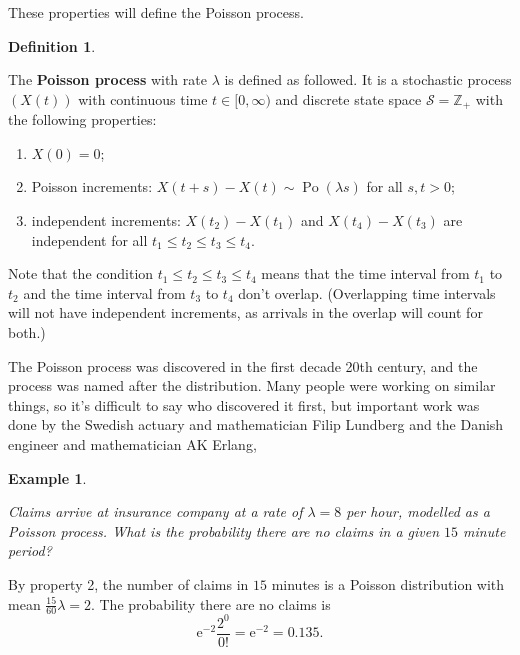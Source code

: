 \documentclass[
  a4paper,
]{article}
\providecommand{\tightlist}{%
  \setlength{\itemsep}{0pt}\setlength{\parskip}{0pt}}
\theoremstyle{definition}
\newtheorem{definition}{Definition}[section]
\theoremstyle{definition}
\newtheorem{example}{Example}[section]
\theoremstyle{definition}
\theoremstyle{remark}
\begin{document}
These properties will define the Poisson process.

\begin{definition}
\protect\hypertarget{def:poisson-def-1}{}\label{def:poisson-def-1}

The \textbf{Poisson process} with rate \(\lambda\) is defined as followed. It is a stochastic process \((X(t))\) with continuous time \(t \in [0,\infty)\) and discrete state space \(\mathcal S = \mathbb Z_+\) with the following properties:

\begin{enumerate}
\def\labelenumi{\arabic{enumi}.}
\tightlist
\item
  \(X(0) = 0\);
\item
  Poisson increments: \(X(t+s) - X(t) \sim \operatorname{Po}(\lambda s)\) for all \(s,t>0\);
\item
  independent increments: \(X(t_2) - X(t_1)\) and \(X(t_4) - X(t_3)\) are independent for all \(t_1 \leq t_2 \leq t_3 \leq t_4\).
\end{enumerate}

\end{definition}

Note that the condition \(t_1 \leq t_2 \leq t_3 \leq t_4\) means that the time interval from \(t_1\) to \(t_2\) and the time interval from \(t_3\) to \(t_4\) don't overlap. (Overlapping time intervals will not have independent increments, as arrivals in the overlap will count for both.)

The Poisson process was discovered in the first decade 20th century, and the process was named after the distribution. Many people were working on similar things, so it's difficult to say who discovered it first, but important work was done by the Swedish actuary and mathematician Filip Lundberg and the Danish engineer and mathematician AK Erlang,

\begin{example}
\protect\hypertarget{exm:poisson-ex-1}{}\label{exm:poisson-ex-1}

\emph{Claims arrive at insurance company at a rate of \(\lambda = 8\) per hour, modelled as a Poisson process. What is the probability there are no claims in a given \(15\) minute period?}

By property 2, the number of claims in \(15\) minutes is a Poisson distribution with mean \(\frac{15}{60}\lambda = 2\). The probability there are no claims is
\[ \mathrm{e}^{-2} \frac{2^0}{0!} = \mathrm{e}^{-2} = 0.135 . \]

\end{example}
\end{document}
